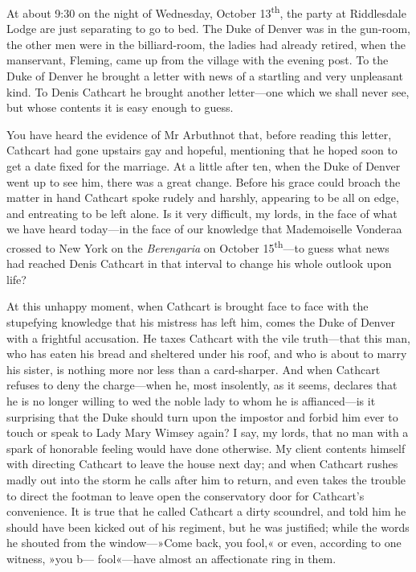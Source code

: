 \begin{dialogue}
\smallskip 

At about 9:30 on the night of Wednesday, October 13\textsuperscript{th}, the party at Riddlesdale Lodge are just separating to go to bed. The Duke of Denver was in the gun-room, the other men were in the billiard-room, the ladies had already retired, when the manservant, Fleming, came up from the village with the evening post. To the Duke of Denver he brought a letter with news of a startling and very unpleasant kind. To Denis Cathcart he brought another letter\allowbreak---\allowbreak one which we shall never see, but whose contents it is easy enough to guess.

\smallskip 

You have heard the evidence of Mr Arbuthnot that, before reading this letter, Cathcart had gone upstairs gay and hopeful, mentioning that he hoped soon to get a date fixed for the marriage. At a little after ten, when the Duke of Denver went up to see him, there was a great change. Before his grace could broach the matter in hand Cathcart spoke rudely and harshly, appearing to be all on edge, and entreating to be left alone. Is it very difficult, my lords, in the face of what we have heard today\allowbreak---\allowbreak in the face of our knowledge that Mademoiselle Vonderaa crossed to New York on the \textit{Berengaria} on October 15\textsuperscript{th}---to guess what news had reached Denis Cathcart in that interval to change his whole outlook upon life?

\smallskip 

At this unhappy moment, when Cathcart is brought face to face with the stupefying knowledge that his mistress has left him, comes the Duke of Denver with a frightful accusation. He taxes Cathcart with the vile truth\allowbreak---\allowbreak that this man, who has eaten his bread and sheltered under his roof, and who is about to marry his sister, is nothing more nor less than a card-sharper. And when Cathcart refuses to deny the charge\allowbreak---\allowbreak when he, most insolently, as it seems, declares that he is no longer willing to wed the noble lady to whom he is affianced\allowbreak---\allowbreak is it surprising that the Duke should turn upon the impostor and forbid him ever to touch or speak to Lady Mary Wimsey again? I say, my lords, that no man with a spark of honorable feeling would have done otherwise. My client contents himself with directing Cathcart to leave the house next day; and when Cathcart rushes madly out into the storm he calls after him to return, and even takes the trouble to direct the footman to leave open the conservatory door for Cathcart's convenience. It is true that he called Cathcart a dirty scoundrel, and told him he should have been kicked out of his regiment, but he was justified; while the words he shouted from the window---»Come back, you fool,« or even, according to one witness, »you b--- fool«---have almost an affectionate ring in them. 


\end{dialogue}
